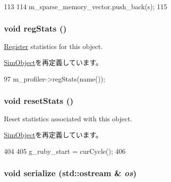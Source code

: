 \begin{DoxyCode}
113 {
114     m_sparse_memory_vector.push_back(s);
115 }
\end{DoxyCode}
\hypertarget{classRubySystem_a4dc637449366fcdfc4e764cdf12d9b11}{
\subsubsection[{regStats}]{\setlength{\rightskip}{0pt plus 5cm}void regStats ()}}
\label{classRubySystem_a4dc637449366fcdfc4e764cdf12d9b11}
\hyperlink{classRegister}{Register} statistics for this object. 

\hyperlink{classSimObject_a4dc637449366fcdfc4e764cdf12d9b11}{SimObject}を再定義しています。


\begin{DoxyCode}
97 { m_profiler->regStats(name()); }
\end{DoxyCode}
\hypertarget{classRubySystem_a65880e61108132689a1bd769b9187fb7}{
\subsubsection[{resetStats}]{\setlength{\rightskip}{0pt plus 5cm}void resetStats ()}}
\label{classRubySystem_a65880e61108132689a1bd769b9187fb7}
Reset statistics associated with this object. 

\hyperlink{classSimObject_a65880e61108132689a1bd769b9187fb7}{SimObject}を再定義しています。


\begin{DoxyCode}
404 {
405     g_ruby_start = curCycle();
406 }
\end{DoxyCode}
\hypertarget{classRubySystem_a53e036786d17361be4c7320d39c99b84}{
\subsubsection[{serialize}]{\setlength{\rightskip}{0pt plus 5cm}void serialize (std::ostream \& {\em os})}}
\label{classRubySystem_a53e036786d17361be4c7320d39c99b84}


